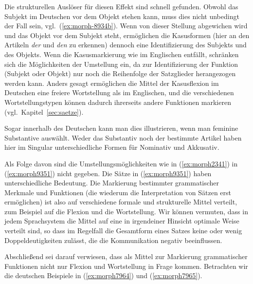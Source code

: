 Die strukturellen Auslöser für diesen Effekt sind schnell gefunden.
Obwohl das Subjekt im Deutschen vor dem Objekt stehen kann, muss dies nicht unbedingt der Fall sein, vgl.\ (\ref{ex:morph-8934b}).
Wenn von dieser Stellung abgewichen wird und das Objekt vor dem Subjekt steht, ermöglichen die Kasusformen (hier an den Artikeln \textit{der} und \textit{den} zu erkennen) dennoch eine Identifizierung des Subjekts und des Objekts.
Wenn die Kasusmarkierung wie im Englischen entfällt, schränken sich die Möglichkeiten der Umstellung ein, da zur Identifizierung der Funktion (Subjekt oder Objekt) nur noch die Reihenfolge der Satzglieder herangezogen werden kann.
Anders gesagt ermöglichen die Mittel der Kasusflexion im Deutschen eine freiere Wortstellung als im Englischen, und die verschiedenen Wortstellungstypen können dadurch ihrerseits andere Funktionen markieren (vgl.\ Kapitel~\ref{sec:saetze}).

Sogar innerhalb des Deutschen kann man dies illustrieren, wenn man \zB feminine Substantive auswählt.
Weder das Substantiv noch der bestimmte Artikel haben hier im Singular unterschiedliche Formen für Nominativ und Akkusativ.

\begin{exe}
  \ex \label{ex:morph9351}
  \begin{xlist}
  \end{xlist}
\end{exe}

Als Folge davon sind die Umstellungsmöglichkeiten wie in (\ref{ex:morph2341}) in (\ref{ex:morph9351}) nicht gegeben.
Die Sätze in (\ref{ex:morph9351}) haben unterschiedliche Bedeutung.
Die Markierung bestimmter grammatischer Merkmale und Funktionen (die wiederum die Interpretation von Sätzen erst ermöglichen) ist also auf verschiedene formale und strukturelle Mittel verteilt, zum Beispiel auf die Flexion und die Wortstellung.
Wir können vermuten, dass in jedem Sprachsystem die Mittel auf eine in irgendeiner Hinsicht optimale Weise verteilt sind, so dass im Regelfall die Gesamtform eines Satzes keine oder wenig Doppeldeutigkeiten zulässt, die die Kommunikation negativ beeinflussen.

Abschließend sei darauf verwiesen, dass als Mittel zur Markierung grammatischer Funktionen nicht nur Flexion und Wortstellung in Frage kommen.
Betrachten wir die deutschen Beispiele in (\ref{ex:morph7964}) und (\ref{ex:morph7965}).

